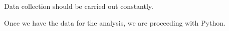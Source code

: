 \documentclass[12pt,a4paper]{article}
\begin{document}
Data collection should be carried out constantly. 

Once we have the data for the analysis, we are proceeding with Python.
\end{document}
